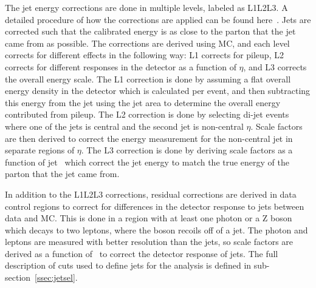 The jet energy corrections are done in multiple levels, labeled as L1L2L3.
A detailed procedure of how the corrections are applied can be found here~\cite{CMS-DP-2015-044}.
Jets are corrected such that the calibrated energy is as close to the parton that the jet came from as possible.
The corrections are derived using MC, and each level corrects for different effects in the following way:
L1 corrects for pileup,
L2 corrects for different responses in the detector as a function of $\eta$,
and L3 corrects the overall energy scale.
The L1 correction is done by assuming a flat overall energy density in the detector which is calculated per event,
and then subtracting this energy from the jet using the jet area to determine the overall energy contributed from pileup.
The L2 correction is done by selecting di-jet events where one of the jets is central and the second jet is non-central $\eta$.
Scale factors are then derived to correct the energy measurement for the non-central jet in separate regions of $\eta$.
The L3 correction is done by deriving scale factors as a function of jet \pt\ which correct the jet energy to match the true energy of the parton that the jet came from.

In addition to the L1L2L3 corrections, residual corrections are derived in data control regions to correct for differences in the detector response to jets between data and MC.
This is done in a region with at least one photon or a Z boson which decays to two leptons, where the boson recoils off of a jet.
The photon and leptons are measured with better resolution than the jets, so scale factors are derived as a function of \pt\ to correct the detector response of jets.
The full description of cuts used to define jets for the analysis is defined in sub-section~\ref{ssec:jetsel}.
